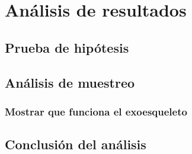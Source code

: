 \chapter{Análisis de resultados}
\section{Prueba de hipótesis}
\section{Análisis de muestreo}
\subsection{Mostrar que funciona el exoesqueleto}
\section{Conclusión del análisis}